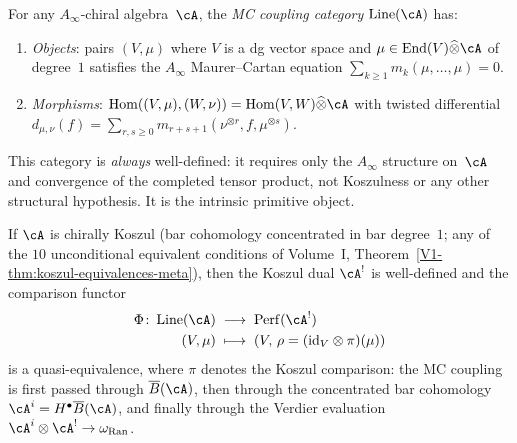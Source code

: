\begin{definition}
\label{def:mc-coupling-category}
For any $A_\infty$-chiral algebra~$\cA$, the \emph{MC coupling
category} $\operatorname{Line}(\cA)$ has:
\begin{enumerate}[label=\textup{(\alph*)}]
\item \emph{Objects}: pairs $(V, \mu)$ where $V$ is a dg vector
 space and $\mu \in \End(V) \widehat\otimes \cA$ of degree~$1$
 satisfies the $A_\infty$ Maurer--Cartan equation
 $\sum_{k \ge 1} m_k(\mu, \ldots, \mu) = 0$.

\item \emph{Morphisms}:
 $\Hom((V,\mu), (W,\nu))
 = \Hom(V, W) \widehat\otimes \cA$
 with twisted differential
 $d_{\mu,\nu}(f)
 = \sum_{r,s \ge 0} m_{r+s+1}(\nu^{\otimes r}, f,
 \mu^{\otimes s})$.
\end{enumerate}
This category is \emph{always} well-defined: it requires only the
$A_\infty$ structure on~$\cA$ and convergence of the completed
tensor product, not Koszulness or any other structural hypothesis.
It is the intrinsic primitive object.
\end{definition}

\begin{theorem}
\label{thm:koszul-comparison-mc}
If $\cA$ is chirally Koszul
\textup{(}bar cohomology concentrated in bar degree~$1$;
any of the $10$ unconditional equivalent conditions of
Volume~I, Theorem~\textup{\ref*{V1-thm:koszul-equivalences-meta}}\textup{)},
then the Koszul dual $\cA^!$ is well-defined and the
comparison functor
\begin{align*}
 \Phi \colon \operatorname{Line}(\cA)
 &\;\longrightarrow\; \Perf(\cA^!) \\
 (V, \mu) &\;\longmapsto\;
 (V,\, \rho = (\mathrm{id}_V \otimes \pi)(\mu))
\end{align*}
is a quasi-equivalence, where $\pi$ denotes the Koszul comparison:
the MC coupling is first passed through $\barB(\cA)$, then through
the concentrated bar cohomology
$\cA^i=H^\bullet\barB(\cA)$, and finally through the Verdier
evaluation $\cA^i\otimes\cA^!\to\omega_{\operatorname{Ran}}$.
\end{theorem}

